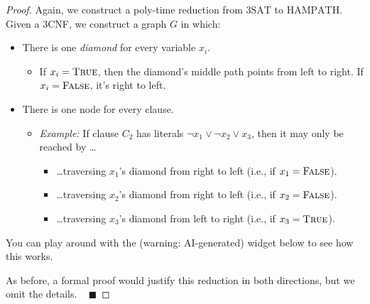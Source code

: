 \begin{proof}
    Again, we construct a poly-time reduction
    from $\mathrm{3SAT}$ to $\mathrm{HAMPATH}$.
    Given a 3CNF, we construct a graph $G$ in which:
    \begin{itemize}
        \item There is one \emph{diamond} for every variable $x_i$.
        \begin{itemize}
            \item If $x_i = \textsc{True}$,
            then the diamond's middle path points from left to right.
            If $x_i = \textsc{False}$, it's right to left.
        \end{itemize}
        \item There is one node for every clause.
        \begin{itemize}
            \item \emph{Example:} If clause $C_2$ has literals
            $\neg x_1 \vee \neg x_2 \vee x_3$,
            then it may only be reached by \dots
            \begin{itemize}
                \item \dots traversing $x_1$'s diamond
                from right to left (i.e., if $x_1 = \textsc{False}$).
                \item \dots traversing $x_2$'s diamond
                from right to left (i.e., if $x_2 = \textsc{False}$).
                \item \dots traversing $x_3$'s diamond
                from left to right (i.e., if $x_3 = \textsc{True}$).
            \end{itemize}
        \end{itemize}
    \end{itemize}
    You can play around with the (warning: AI-generated) widget below
    to see how this works.


    As before, a formal proof would justify this reduction
    in both directions, but we omit the details. ~ $\blacksquare$
\end{proof}

